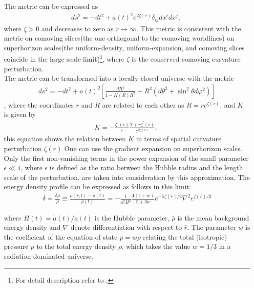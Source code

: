  The metric can be expressed as
 \begin{align}
     ds^2=-dt^2+a(t)^2e^{2\zeta(r)}\delta_{ij}dx^idx^j ,\ \label{3.2}
 \end{align} 
 where $\zeta>0$ and decreases to zero as $r \rightarrow \infty$. This metric is consistent with the metric on comoving slices(the one orthogonal to the comoving worldlines) on superhorizon scales(the uniform-density, uniform-expansion, and comoving slices coincide in the large scale limit)\footnote{For detail description refer to \cite{Lyth_2005},\cite{Harada_2015}}, where $\zeta$ is the conserved comoving curvature perturbation.\\
 The metric can be transformed into a locally closed universe with the metric \begin{align*}
     ds^2=-dt^2+a(t)^2\left[\frac{dR^2}{1-K(R)R^2}+R^2\left(d\theta^2+\sin^2\theta d\varphi^2\right)\right]
 \end{align*}, 
 where the coordinates $r$ and $R$ are related to each other as $R=re^{\zeta(r)}$, and $K$ is given by
 \begin{align}
     K=-\frac{\zeta^{\prime}(r)}{r}\frac{2+r\zeta^{\prime}(r)}{e^{2\zeta(r)}},\ \label{3.3}
 \end{align}
this equation shows the relation between $K$ in terms of spatial curvature perturbation $\zeta(r)$
One can use the gradient expansion on superhorizon scales\cite{Shibata_1999, Polnarev:2006aa}. Only the first non-vanishing terms in the power expansion of the small parameter $\epsilon \ll 1$, where $\epsilon$ is defined as the ratio between the Hubble radius and the length scale of the perturbation, are taken into consideration by this approximation. The energy density profile can be expressed as follows in this limit\cite{Harada_2015, Musco:2018rwt}:
\begin{align}
    \delta = \frac{\delta \rho}{\bar{\rho}} \equiv \frac{\rho(r, t)-\bar{\rho}(t)}{\bar{\rho}(t)}=-\frac{1}{a^2 H^2} \frac{4(1+w)}{5+3 w} e^{-5 \zeta(\hat{r}) / 2} \nabla^2 e^{\zeta(\hat{r}) / 2} \label{3.4}
\end{align}

where $H(t)=\dot{a}(t) / a(t)$ is the Hubble parameter, $\bar{\rho}$ is the mean background energy density and $\nabla$ denote differentiation with respect to $\hat{r}$. The parameter $w$ is the coefficient of the equation of state $p=w \rho$ relating the total (isotropic) pressure $p$ to the total energy density $\rho$, which takes the value $w=1 / 3$ in a radiation-dominated universe.

